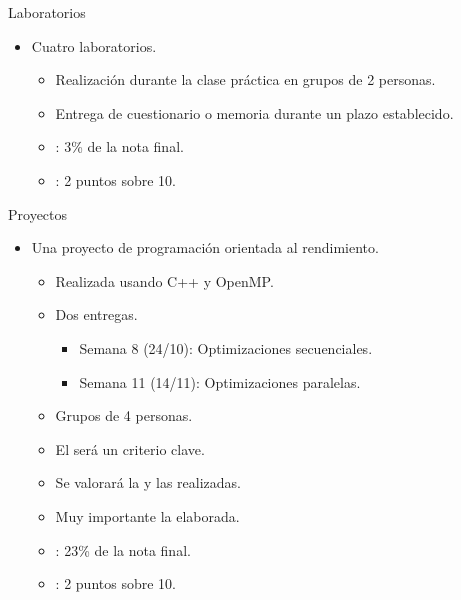 \begin{frame}[t]{Laboratorios}
\begin{itemize}
  \item Cuatro laboratorios.
    \begin{itemize}
      \item Realización durante la clase práctica en grupos de 2 personas.
      \item Entrega de cuestionario o memoria durante un plazo
            establecido.
      \item {}: 3\% de la nota final.
      \item {}: 2 puntos sobre 10.
    \end{itemize}
\end{itemize}
\end{frame}

\begin{frame}[t]{Proyectos}
\begin{itemize}
  \item Una proyecto de programación orientada al rendimiento.
    \begin{itemize}
      \item Realizada usando C++ y OpenMP.
      \item Dos entregas.
        \begin{itemize}
          \item Semana 8 (24/10): Optimizaciones secuenciales.
          \item Semana 11 (14/11): Optimizaciones paralelas.
        \end{itemize}
      \item Grupos de 4 personas.
      \item El  será un criterio clave.
      \item Se valorará la  y las 
             realizadas.
      \item Muy importante la  elaborada.
      \item {}: 23\% de la nota final.
      \item {}: 2 puntos sobre 10.
    \end{itemize}
\end{itemize}
\end{frame}

